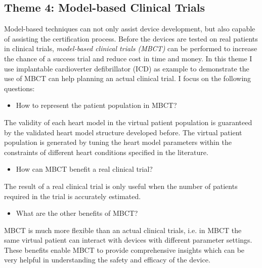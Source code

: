 \documentclass[a4paper]{article}
\begin{document}
\subsection*{Theme 4: Model-based Clinical Trials}
Model-based techniques can not only assist device development, but also capable of assisting the certification process.
Before the devices are tested on real patients in clinical trials, \emph{model-based clinical trials (MBCT)} can be performed to increase the chance of a success trial and reduce cost in time and money.
In this theme I use implantable cardioverter defibrillator (ICD) as example to demonstrate the use of MBCT can help planning an actual clinical trial.
I focus on the following questions:
\begin{itemize}
\item How to represent the patient population in MBCT?
\end{itemize}
The validity of each heart model in the virtual patient population is guaranteed by the validated heart model structure developed before.
The virtual patient population is generated by tuning the heart model parameters within the constraints of different heart conditions specified in the literature.
\begin{itemize}
\item How can MBCT benefit a real clinical trial?
\end{itemize}
The result of a real clinical trial is only useful when the number of patients required in the trial is accurately estimated.

\begin{itemize}
\item What are the other benefits of MBCT?
\end{itemize}
MBCT is much more flexible than an actual clinical trials, i.e. in MBCT the same virtual patient can interact with devices with different parameter settings.
These benefits enable MBCT to provide comprehensive insights which can be very helpful in understanding the safety and efficacy of the device.

\end{document}

